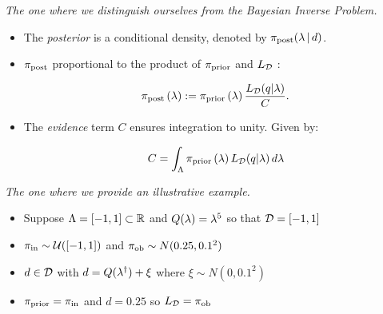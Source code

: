\begin{frame}[t]{\it The one where we distinguish ourselves from the Bayesian Inverse Problem.}

\begin{itemize}
	\item The \emph{posterior} is a conditional density, denoted by $\operatorname*{\pi_{post}}(\lambda\, | \, d)$.

	\bigskip
	\item $\operatorname*{\pi_{post}}$ proportional to the product of $\operatorname*{\pi_{prior}}$ and $L_{\mathcal{D}}$ \cite{Walpole, Berger, Complete, Smith}:

\begin{equation}\label{eq:sb_post}
    \operatorname*{\pi_{post}}\left ( \lambda \right ) := \operatorname*{\pi_{prior}}\left ( \lambda \right ) \frac{L_{\mathcal{D}} (q | \lambda)}{ C }.
\end{equation}

	\bigskip
	\item The \emph{evidence} term $C$ ensures integration to unity. Given by:

$$C = \int_{\Lambda} \operatorname*{\pi_{prior}}\left ( \lambda \right ) L_{\mathcal{D}}(q | \lambda) \, d\lambda$$

\end{itemize}

\end{frame}

\begin{frame}[t]{\it The one where we provide an illustrative example.}

\begin{itemize}
\item Suppose ${\Lambda} = [-1,1]\subset\mathbb{R}$ and $Q(\lambda)=\lambda^5$ so that $\mathcal{D} = [-1,1]$

\bigskip
\item $\operatorname*{\pi_{in}}\sim \mathcal{U}([-1,1])$ and $\operatorname*{\pi_{ob}}\sim N(0.25,0.1^2)$

\bigskip
\item $d\in \mathcal{D}$ with $d=Q(\lambda^\dagger)+\xi$ where $\xi\sim N(0,0.1^2)$

\bigskip
\item $\operatorname*{\pi_{prior}} = \operatorname*{\pi_{in}}$ and $d=0.25$ so $L_{\mathcal{D}} = \operatorname*{\pi_{ob}}$
\end{itemize}

\end{frame}


